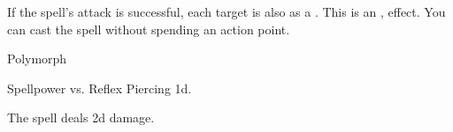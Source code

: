 If the spell's attack is successful, each target is also \deafened as a .
This is an ,  effect.
You can cast the spell without spending an action point.
\begin{spellsection}{Polymorph}
\begin{spellheader}
\end{spellheader}
\begin{spellcontent}
\begin{spelltargetinginfo}
\end{spelltargetinginfo}
\begin{spelleffects}
\begin{spellattack}{Spellpower vs. Reflex}
\spellsuccess Piercing  \plus1d.
\end{spellattack}
\end{spelleffects}
\end{spellcontent}
\begin{spellfooter}
\end{spellfooter}
\begin{spellsubcontent}
\begin{spellcantrip}
The spell deals \minus2d damage.
\end{spellcantrip}
\end{spellsubcontent}
\end{spellsection}
